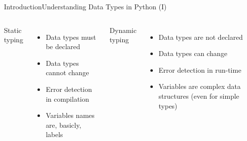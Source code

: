 \documentclass[10pt,compress]{beamer} %
\begin{document}
\begin{frame}{Introduction}{Understanding Data Types in Python (I)}

    \begin{columns}
			
			\begin{block}{\footnotesize{Static typing}}
			\vspace{-0.2cm} 
				
			\vspace{-0.2cm} 
			\end{block}

			\begin{itemize}
				\item Data types must be declared
				\item Data types cannot change
				\item Error detection in compilation
				\item Variables names are, basicly, labels
			\end{itemize}
			
			\begin{block}{\footnotesize{Dynamic typing}}
			\vspace{-0.2cm} 
				
			\vspace{-0.2cm} 
			\end{block}

			\begin{itemize}
				\item Data types are not declared
				\item Data types can change
				\item Error detection in run-time
				\item Variables are complex data structures (even for simple types)
			\end{itemize}
	\end{columns}
\end{frame}
\end{document}
